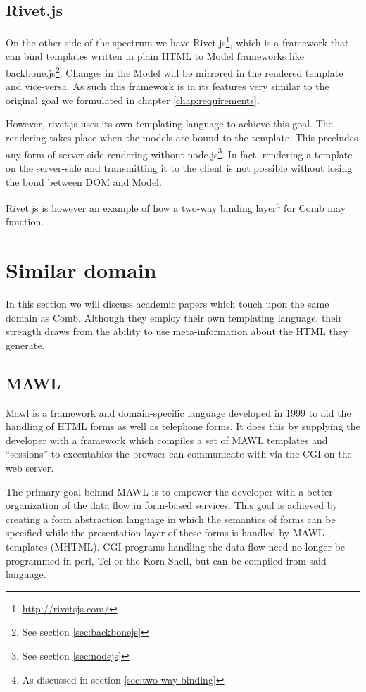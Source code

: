 \documentclass[thesis.tex]{subfiles}
\begin{document}
\subsection{Rivet.js}
On the other side of the spectrum we have Rivet.js\footnote{
\url{http://rivetsjs.com/}}, which is a framework that
can bind templates written in plain HTML to Model frameworks like
backbone.js\footnote{See section \ref{sec:backbonejs}}.
Changes in the Model will be mirrored in the rendered template and vice-versa.
As such this framework is in its features very similar to the original goal we
formulated in chapter \ref{chap:requirements}.

However, rivet.js uses its own templating language to achieve this goal.
The rendering takes place when the models are bound to the template.
This precludes any form of server-side rendering without
node.js\footnote{See section \ref{sec:nodejs}}.
In fact, rendering a template on the server-side and transmitting it to the
client is not possible without losing the bond between DOM and Model.

Rivet.js is however an example of how a two-way binding layer\footnote{
As discussed in section \ref{sec:two-way-binding}} for Comb may function.



\section{Similar domain}
In this section we will discuss academic papers which touch upon the same domain as Comb.
Although they employ their own templating language, their strength draws from
the ability to use meta-information about the HTML they generate.

\subsection{MAWL}
Mawl\cite{MAWL} is a framework and domain-specific language developed in 1999
to aid the handling of HTML forms as well as telephone forms.
It does this by supplying the developer with a framework which compiles
a set of MAWL templates and ``sessions'' to executables
the browser can communicate with via the CGI on the web server.

The primary goal behind MAWL is to empower the developer with a better
organization of the data flow in form-based services.
This goal is achieved by creating a form abstraction language in which the
semantics of forms can be specified while the presentation layer of these forms
is handled by MAWL templates (MHTML).
CGI programs handling the data flow need no longer be programmed in
perl, Tcl or the Korn Shell, but can be compiled from said language.
\end{document}
